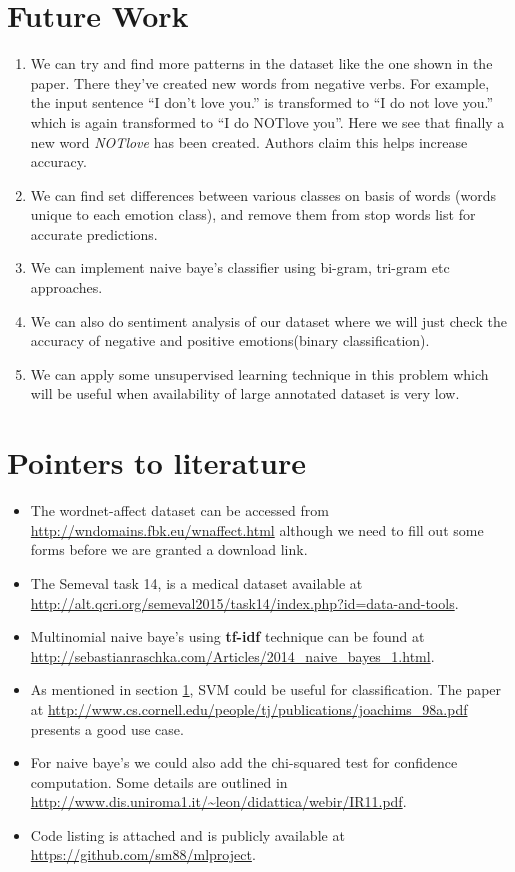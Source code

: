 \newpage
\section{Future Work}
\label{sec-plan-for-sem}
\begin{enumerate}
 \item We can try and find more patterns in the dataset like the one shown in the paper. There they've created new words from negative verbs. For example, the input sentence ``I don't love you.'' is transformed to ``I do not love you.'' which is again transformed to ``I do NOTlove you''. Here we see that finally a new word \emph{NOTlove} has been created. Authors claim this helps increase accuracy.
 \item We can find set differences between various classes on basis of words (words unique to each emotion class), and remove them from stop words list for accurate predictions.
 \item We can implement naive baye's classifier using bi-gram, tri-gram etc approaches.
 \item We can also do sentiment analysis of our dataset where we will just check the accuracy of negative and positive emotions(binary classification).
 \item We can apply some unsupervised learning technique in this problem which will be useful when availability of large annotated dataset is very low.
\end{enumerate}
\section{Pointers to literature}
\begin{itemize}
 \item The wordnet-affect dataset can be accessed from \url{http://wndomains.fbk.eu/wnaffect.html} although we need to fill out some forms before we are granted a download link.
 \item The Semeval task 14, is a medical dataset available at \url{http://alt.qcri.org/semeval2015/task14/index.php?id=data-and-tools}.
 \item Multinomial naive baye's using \textbf{tf-idf} technique can be found at \url{http://sebastianraschka.com/Articles/2014_naive_bayes_1.html}.
 \item As mentioned in section \ref{sec-plan-for-sem}, SVM could be useful for classification. The paper at \url{http://www.cs.cornell.edu/people/tj/publications/joachims_98a.pdf} presents a good use case.
 \item For naive baye's we could also add the chi-squared test for confidence computation. Some details are outlined in \url{http://www.dis.uniroma1.it/~leon/didattica/webir/IR11.pdf}.
 \item Code listing is attached and is publicly available at \url{https://github.com/sm88/mlproject}.
\end{itemize}

